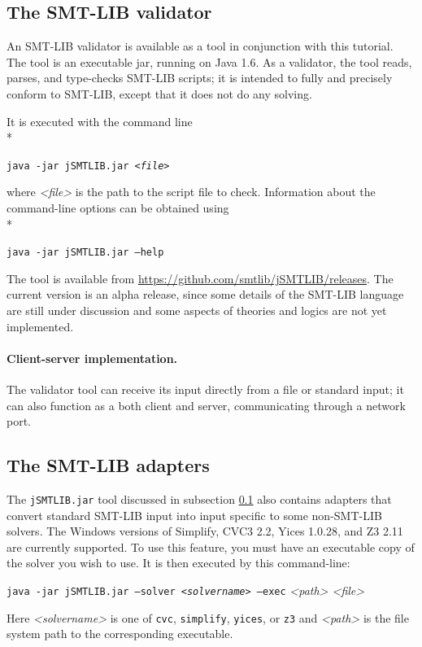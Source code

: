 \documentclass[12pt,oneside]{report}
\begin{document}
\subsection{The SMT-LIB validator}
\label{validator}
An SMT-LIB validator is available as a tool in conjunction with this tutorial. The tool is an executable jar, running on Java 1.6.  As a validator, the tool reads, parses, and type-checks SMT-LIB scripts; it is intended to fully and precisely conform to SMT-LIB, except that it does not do any solving.


It is executed with the command line \\*
\centerline{\tt java -jar jSMTLIB.jar {\it <file>}}
where {\it <file>} is the path to the script file to check.
Information about the command-line options can be obtained using \\*
\centerline{\tt java -jar jSMTLIB.jar --help}

The tool is available from \url{https://github.com/smtlib/jSMTLIB/releases}. The current version is an alpha release, since some details of the SMT-LIB language are still under discussion and some aspects of theories and logics are not yet implemented. 

\paragraph{Client-server implementation.} The validator tool can receive its input directly from a file or standard input; it can also function as a both client and server, communicating through a network port.

\subsection{The SMT-LIB adapters}
The {\tt jSMTLIB.jar} tool discussed in subsection \ref{validator} also contains adapters that convert standard SMT-LIB input into input specific to some non-SMT-LIB solvers. The Windows versions of Simplify, CVC3 2.2, Yices 1.0.28, and Z3 2.11 are currently supported. To use this feature, you must have an
executable copy of the solver you wish to use. It is then executed by this command-line:
\centerline{{\tt java -jar jSMTLIB.jar --solver {\it <solvername>} --exec} {\it <path> <file>}}
Here {\it <solvername>} is one of {\tt cvc}, {\tt simplify}, {\tt yices}, or {\tt z3} and 
{\it <path>} is the file system path to the corresponding executable.
\end{document}

